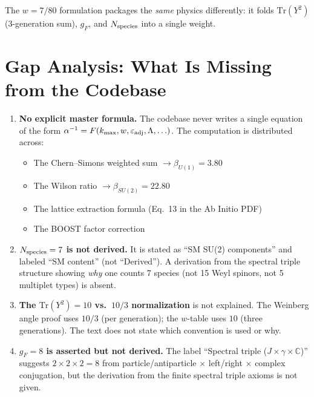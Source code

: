 \documentclass[11pt]{article}
\begin{document}
The $w = 7/80$ formulation packages the \emph{same} physics differently:
it folds $\mathrm{Tr}(Y^2)$ (3-generation sum), $g_F$, and $N_{\rm species}$
into a single weight.

\section{Gap Analysis: What Is Missing from the Codebase}

\begin{enumerate}
\item \textbf{No explicit master formula.}  The codebase never writes
a single equation of the form
$\alpha^{-1} = F(k_{\max}, w, \varepsilon_{\rm adj}, \Lambda, \ldots)$.
The computation is distributed across:
\begin{itemize}
\item The Chern--Simons weighted sum $\to \beta_{U(1)} = 3.80$
\item The Wilson ratio $\to \beta_{SU(2)} = 22.80$
\item The lattice extraction formula (Eq.~13 in the Ab Initio PDF)
\item The BOOST factor correction
\end{itemize}

\item \textbf{$N_{\rm species} = 7$ is not derived.}  It is stated as
``SM SU(2) components'' and labeled ``SM content'' (not ``Derived'').
A derivation from the spectral triple structure showing \emph{why} one
counts 7 species (not 15 Weyl spinors, not 5 multiplet types) is absent.

\item \textbf{The $\mathrm{Tr}(Y^2) = 10$ vs.\ $10/3$ normalization}
is not explained.  The Weinberg angle proof uses $10/3$ (per generation);
the $w$-table uses $10$ (three generations).  The text does not state
which convention is used or why.

\item \textbf{$g_F = 8$ is asserted but not derived.}  The label
``Spectral triple ($J \times \gamma \times \mathbb{C}$)'' suggests
$2 \times 2 \times 2 = 8$ from particle/antiparticle $\times$
left/right $\times$ complex conjugation, but the derivation from the
finite spectral triple axioms is not given.
\end{enumerate}
\end{document}
